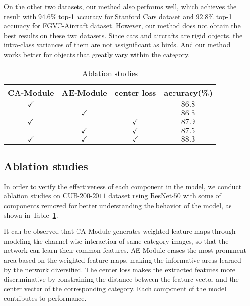 \documentclass[conference]{IEEEtran}
\begin{document}
On the other two datasets, our method also performs well, which achieves the result with $94.6\%$ top-1 accuracy for Stanford Cars dataset and $92.8\%$ top-1 accuracy for FGVC-Aircraft dataset. However, our method does not obtain the best results on these two datasets. Since cars and aircrafts are rigid objects, the intra-class variances of them are not assignificant as birds. And our method works better for objects that greatly vary within the category.
\begin{table}
\begin{center}
\caption{Ablation studies} \label{tab:Ablation studies}
\begin{tabular}{c|c|c|c}
  \hline
  CA-Module & AE-Module & center loss & accuracy(\%)  \\
\hline
\hline
  $\checkmark$ &  &  & $86.8$  \\
& $\checkmark$ &  & $86.5$ \\
$\checkmark$ &  & $\checkmark$ &  $87.9$ \\
& $\checkmark$ & $\checkmark$ & $87.5$ \\
$\checkmark$ & $\checkmark$ & $\checkmark$ & $88.3$  \\
  \hline
\end{tabular}
\end{center}
\vspace{-0.2cm}
\end{table}
\subsection{Ablation studies}
In order to verify the effectiveness of each component in the model, we conduct ablation studies on CUB-$200$-$2011$ dataset using ResNet-$50$ with some of components removed for better understanding the behavior of the model, as shown in Table~\ref{tab:Ablation studies}. 

It can be observed that CA-Module generates weighted feature maps through modeling the channel-wise interaction of same-category images, so that the network can learn their common features. AE-Module erases the most prominent area based on the weighted feature maps, making the informative areas learned by the network diversified. The center loss makes the extracted features more discriminative by constraining the distance between the feature vector and the center vector of the corresponding category. Each component of the model contributes to performance.
\end{document}
